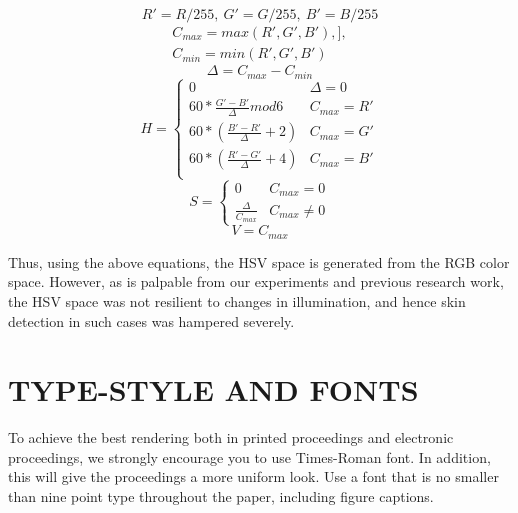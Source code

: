 \documentclass[letterpaper, 11 pt, twoside, conference]{ieeeconf}
\begin{document}
\begin{equation}
  R' = R/255,\ G' = G/255,\ B' = B/255
\end{equation}
\begin{equation}
  \begin{multlined}
C_{max} = max(R', G', B'),],\\
C_{min} = min(R', G', B')
  \end{multlined}
\end{equation}
\begin{equation}
  \Delta = C_{max} - C_{min}
\end{equation}
\begin{equation}
   H = \begin{cases} 
            0 & \Delta = 0 \\
   60 * \frac{G'-B'}{\Delta}mod6 & C_{max} = R' \\
     60 * (\frac{B'-R'}{\Delta}+2) & C_{max}=G' \\
     60 * (\frac{R'-G'}{\Delta}+4) & C_{max} = B'\\

         \end{cases}
\end{equation}
\begin{equation}
  S = \begin{cases}
      0 & C_{max} = 0\\
      \frac{\Delta}{C_{max}} & C_{max} \neq 0
  \end{cases}
\end{equation}
\begin{equation}
  V = C_{max}
\end{equation}

Thus, using the above equations, the HSV space is generated from the RGB color space.
However, as is palpable from our experiments and previous research work, the HSV space
was not resilient to changes in illumination, and hence skin detection in such cases
was hampered severely.

\section{TYPE-STYLE AND FONTS}
\label{sec:typestyle}

To achieve the best rendering both in printed proceedings and electronic proceedings, we
strongly encourage you to use Times-Roman font.  In addition, this will give
the proceedings a more uniform look.  Use a font that is no smaller than nine
point type throughout the paper, including figure captions.
\end{document}
